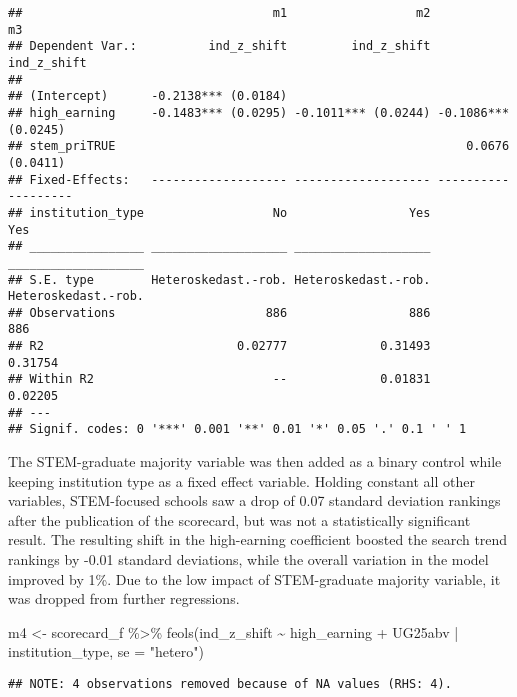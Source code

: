 \documentclass[
]{article}
\newenvironment{Shaded}{\begin{snugshade}}{\end{snugshade}}
\newcommand{\AttributeTok}[1]{\textcolor[rgb]{0.77,0.63,0.00}{#1}}
\newcommand{\FunctionTok}[1]{\textcolor[rgb]{0.00,0.00,0.00}{#1}}
\newcommand{\NormalTok}[1]{#1}
\newcommand{\OtherTok}[1]{\textcolor[rgb]{0.56,0.35,0.01}{#1}}
\newcommand{\SpecialCharTok}[1]{\textcolor[rgb]{0.00,0.00,0.00}{#1}}
\newcommand{\StringTok}[1]{\textcolor[rgb]{0.31,0.60,0.02}{#1}}
\begin{document}
\begin{verbatim}
##                                   m1                  m2                  m3
## Dependent Var.:          ind_z_shift         ind_z_shift         ind_z_shift
##                                                                             
## (Intercept)      -0.2138*** (0.0184)                                        
## high_earning     -0.1483*** (0.0295) -0.1011*** (0.0244) -0.1086*** (0.0245)
## stem_priTRUE                                                 0.0676 (0.0411)
## Fixed-Effects:   ------------------- ------------------- -------------------
## institution_type                  No                 Yes                 Yes
## ________________ ___________________ ___________________ ___________________
## S.E. type        Heteroskedast.-rob. Heteroskedast.-rob. Heteroskedast.-rob.
## Observations                     886                 886                 886
## R2                           0.02777             0.31493             0.31754
## Within R2                         --             0.01831             0.02205
## ---
## Signif. codes: 0 '***' 0.001 '**' 0.01 '*' 0.05 '.' 0.1 ' ' 1
\end{verbatim}

The STEM-graduate majority variable was then added as a binary control
while keeping institution type as a fixed effect variable. Holding
constant all other variables, STEM-focused schools saw a drop of 0.07
standard deviation rankings after the publication of the scorecard, but
was not a statistically significant result. The resulting shift in the
high-earning coefficient boosted the search trend rankings by -0.01
standard deviations, while the overall variation in the model improved
by 1\%. Due to the low impact of STEM-graduate majority variable, it was
dropped from further regressions.

\begin{Shaded}
\begin{Highlighting}[]
\NormalTok{m4 }\OtherTok{\textless{}{-}}\NormalTok{ scorecard\_f }\SpecialCharTok{\%\textgreater{}\%} \FunctionTok{feols}\NormalTok{(ind\_z\_shift }\SpecialCharTok{\textasciitilde{}}\NormalTok{ high\_earning }\SpecialCharTok{+}\NormalTok{ UG25abv }\SpecialCharTok{|}\NormalTok{ institution\_type, }\AttributeTok{se =} \StringTok{"hetero"}\NormalTok{)}
\end{Highlighting}
\end{Shaded}

\begin{verbatim}
## NOTE: 4 observations removed because of NA values (RHS: 4).
\end{verbatim}
\end{document}
